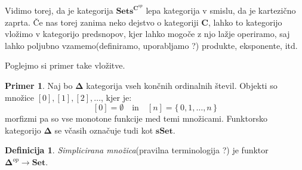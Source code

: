 \documentclass[12pt,a4paper]{book}
\theoremstyle{definition}
\newtheorem{definicija}{Definicija}[chapter]
\theoremstyle{plain}
\theoremstyle{definition}
\newtheorem{primer}{Primer}[section]
\theoremstyle{remark}
\newcommand{\cat}[1]{\textbf{#1}}
\renewcommand{\set}[1]{\{\,#1\,\}}
\newcommand{\predsnop}[1]{\cat{Sets}^{\cat{#1}^{op}}}
\begin{document}
Vidimo torej, da je kategorija $\predsnop{C}$ lepa kategorija v smislu, da je kartezično zaprta. Če nas torej zanima neko dejstvo o kategoriji $\cat{C}$, lahko to kategorijo vložimo v kategorijo predsnopov, kjer lahko mogoče z njo lažje operiramo, saj lahko poljubno vzamemo(definiramo, uporabljamo ?) produkte, eksponente, itd.


Poglejmo si primer take vložitve.

\begin{primer}
Naj bo $\mathbf{\Delta}$ kategorija vseh končnih ordinalnih števil. Objekti so množice $[0],[1],[2],\ldots$, kjer je:
$$[0] = \emptyset \quad \text{in} \quad [n] = \set{0,1,\ldots,n}$$
morfizmi pa so vse monotone funkcije med temi množicami.
Funktorsko kategorijo $\mathbf{\Delta}$ se včasih označuje tudi kot $\cat{sSet}$.
\begin{definicija}
\emph{Simplicirana množica}(pravilna terminologija ?) je funktor $\mathbf{\Delta}^{op} \to \cat{Set}$.


\end{definicija}
\end{primer}
\end{document}
